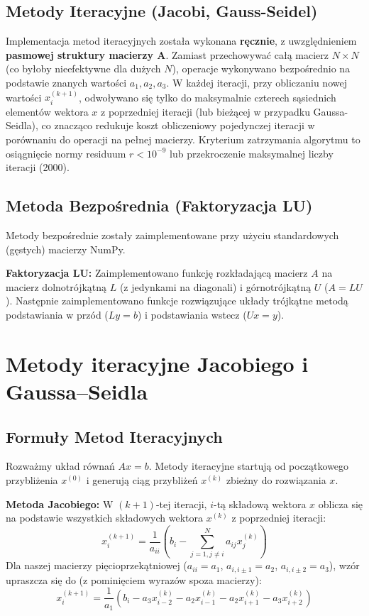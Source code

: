 \documentclass[a4paper, 11pt]{article}
\begin{document}
\subsection{Metody Iteracyjne (Jacobi, Gauss-Seidel)}
Implementacja metod iteracyjnych została wykonana \textbf{ręcznie}, z uwzględnieniem \textbf{pasmowej struktury macierzy A}. Zamiast przechowywać całą macierz $N \times N$ (co byłoby nieefektywne dla dużych $N$), operacje wykonywano bezpośrednio na podstawie znanych wartości $a_1, a_2, a_3$. W każdej iteracji, przy obliczaniu nowej wartości $x_i^{(k+1)}$, odwoływano się tylko do maksymalnie czterech sąsiednich elementów wektora $x$ z poprzedniej iteracji (lub bieżącej w przypadku Gaussa-Seidla), co znacząco redukuje koszt obliczeniowy pojedynczej iteracji w porównaniu do operacji na pełnej macierzy. Kryterium zatrzymania algorytmu to osiągnięcie normy residuum $r < 10^{-9}$ lub przekroczenie maksymalnej liczby iteracji (2000).

\subsection{Metoda Bezpośrednia (Faktoryzacja LU)}
Metody bezpośrednie zostały zaimplementowane przy użyciu standardowych (gęstych) macierzy NumPy.

\textbf{Faktoryzacja LU:} Zaimplementowano funkcję rozkładającą macierz $A$ na macierz dolnotrójkątną $L$ (z jedynkami na diagonali) i górnotrójkątną $U$ ($A = LU$). Następnie zaimplementowano funkcje rozwiązujące układy trójkątne metodą podstawiania w przód ($Ly=b$) i podstawiania wstecz ($Ux=y$).

\section{Metody iteracyjne Jacobiego i Gaussa–Seidla}

\subsection{Formuły Metod Iteracyjnych}
Rozważmy układ równań $Ax=b$. Metody iteracyjne startują od początkowego przybliżenia $x^{(0)}$ i generują ciąg przybliżeń $x^{(k)}$ zbieżny do rozwiązania $x$.

\textbf{Metoda Jacobiego:} W $(k+1)$-tej iteracji, $i$-tą składową wektora $x$ oblicza się na podstawie wszystkich składowych wektora $x^{(k)}$ z poprzedniej iteracji:
\begin{equation}
x_i^{(k+1)} = \frac{1}{a_{ii}} \left( b_i - \sum_{j=1, j \neq i}^{N} a_{ij} x_j^{(k)} \right)
\end{equation}
Dla naszej macierzy pięcioprzekątniowej ($a_{ii}=a_1$, $a_{i,i\pm 1}=a_2$, $a_{i,i\pm 2}=a_3$), wzór upraszcza się do (z pominięciem wyrazów spoza macierzy):
\begin{equation}
x_i^{(k+1)} = \frac{1}{a_1} \left( b_i - a_3 x_{i-2}^{(k)} - a_2 x_{i-1}^{(k)} - a_2 x_{i+1}^{(k)} - a_3 x_{i+2}^{(k)} \right)
\label{eq:jacobi_sparse}
\end{equation}
\end{document}
